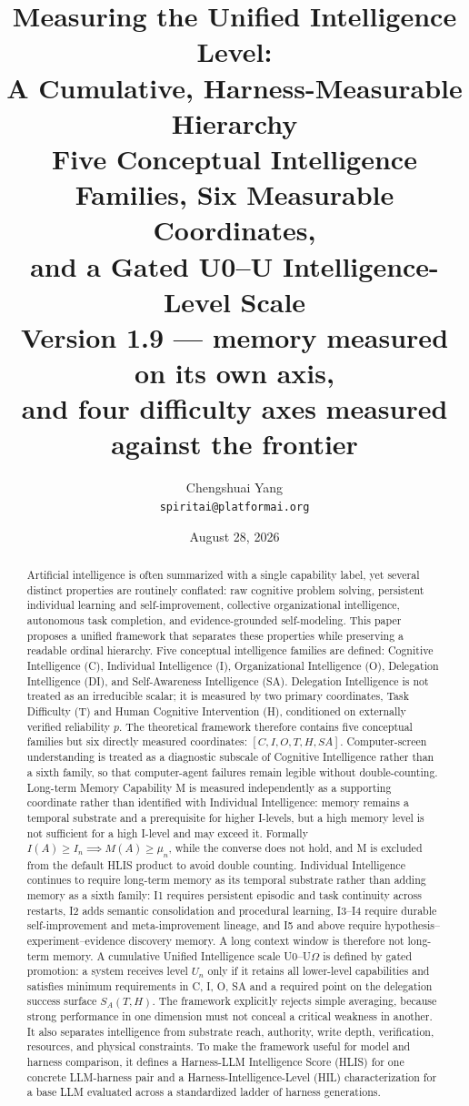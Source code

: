 \documentclass[11pt]{article}
\title{\LARGE Measuring the Unified Intelligence Level:\\[6pt]
A Cumulative, Harness-Measurable Hierarchy\\[8pt]
\large Five Conceptual Intelligence Families, Six Measurable Coordinates,\\
and a Gated U0--U\Om{} Intelligence-Level Scale\\[10pt]
\normalsize Version 1.9 --- memory measured on its own axis,\\
and four difficulty axes measured against the frontier}
\author{Chengshuai Yang\\
\small\texttt{spiritai@platformai.org}}
\date{August 28, 2026}
\theoremstyle{definition}
\newcommand{\Om}{\ensuremath{\Omega}}
\newcommand{\SA}{\ensuremath{S_A(T,H)}}
\begin{document}
\maketitle

\begin{abstract}
Artificial intelligence is often summarized with a single capability label, yet several distinct properties are routinely conflated: raw cognitive problem solving, persistent individual learning and self-improvement, collective organizational intelligence, autonomous task completion, and evidence-grounded self-modeling. This paper proposes a unified framework that separates these properties while preserving a readable ordinal hierarchy. Five conceptual intelligence families are defined: Cognitive Intelligence (C), Individual Intelligence (I), Organizational Intelligence (O), Delegation Intelligence (DI), and Self-Awareness Intelligence (SA). Delegation Intelligence is not treated as an irreducible scalar; it is measured by two primary coordinates, Task Difficulty (T) and Human Cognitive Intervention (H), conditioned on externally verified reliability $p$. The theoretical framework therefore contains five conceptual families but six directly measured coordinates: $[C, I, O, T, H, SA]$. Computer-screen understanding is treated as a diagnostic subscale of Cognitive Intelligence rather than a sixth family, so that computer-agent failures remain legible without double-counting. Long-term Memory Capability M is measured independently as a supporting coordinate rather than identified with Individual Intelligence: memory remains a temporal substrate and a prerequisite for higher I-levels, but a high memory level is not sufficient for a high I-level and may exceed it. Formally $I(A) \ge I_n \implies M(A) \ge \mu_n$, while the converse does not hold, and M is excluded from the default HLIS product to avoid double counting. Individual Intelligence continues to require long-term memory as its temporal substrate rather than adding memory as a sixth family: I1 requires persistent episodic and task continuity across restarts, I2 adds semantic consolidation and procedural learning, I3--I4 require durable self-improvement and meta-improvement lineage, and I5 and above require hypothesis--experiment--evidence discovery memory. A long context window is therefore not long-term memory. A cumulative Unified Intelligence scale U0--U\Om{} is defined by gated promotion: a system receives level $U_n$ only if it retains all lower-level capabilities and satisfies minimum requirements in C, I, O, SA and a required point on the delegation success surface \SA{}. The framework explicitly rejects simple averaging, because strong performance in one dimension must not conceal a critical weakness in another. It also separates intelligence from substrate reach, authority, write depth, verification, resources, and physical constraints. To make the framework useful for model and harness comparison, it defines a Harness-LLM Intelligence Score (HLIS) for one concrete LLM-harness pair and a Harness-Intelligence-Level (HIL) characterization for a base LLM evaluated across a standardized ladder of harness generations.


\end{abstract}
\end{document}
